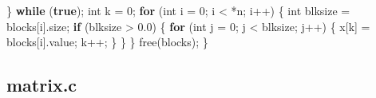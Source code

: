 \documentclass[
  12pt,
  letterpaper,
  DIV=11,
  numbers=noendperiod]{scrreprt}
\newenvironment{Shaded}{\begin{snugshade}}{\end{snugshade}}
\newcommand{\ControlFlowTok}[1]{\textcolor[rgb]{0.00,0.23,0.31}{\textbf{#1}}}
\newcommand{\DataTypeTok}[1]{\textcolor[rgb]{0.68,0.00,0.00}{#1}}
\newcommand{\DecValTok}[1]{\textcolor[rgb]{0.68,0.00,0.00}{#1}}
\newcommand{\FloatTok}[1]{\textcolor[rgb]{0.68,0.00,0.00}{#1}}
\newcommand{\KeywordTok}[1]{\textcolor[rgb]{0.00,0.23,0.31}{\textbf{#1}}}
\newcommand{\NormalTok}[1]{\textcolor[rgb]{0.00,0.23,0.31}{#1}}
\newcommand{\OperatorTok}[1]{\textcolor[rgb]{0.37,0.37,0.37}{#1}}
\theoremstyle{remark}
\begin{document}
\begin{Shaded}
\begin{Highlighting}[]
    \OperatorTok{\}} \ControlFlowTok{while} \OperatorTok{(}\KeywordTok{true}\OperatorTok{);}
    \DataTypeTok{int}\NormalTok{ k }\OperatorTok{=} \DecValTok{0}\OperatorTok{;}
    \ControlFlowTok{for} \OperatorTok{(}\DataTypeTok{int}\NormalTok{ i }\OperatorTok{=} \DecValTok{0}\OperatorTok{;}\NormalTok{ i }\OperatorTok{\textless{}} \OperatorTok{*}\NormalTok{n}\OperatorTok{;}\NormalTok{ i}\OperatorTok{++)} \OperatorTok{\{}
        \DataTypeTok{int}\NormalTok{ blksize }\OperatorTok{=}\NormalTok{ blocks}\OperatorTok{[}\NormalTok{i}\OperatorTok{].}\NormalTok{size}\OperatorTok{;}
        \ControlFlowTok{if} \OperatorTok{(}\NormalTok{blksize }\OperatorTok{\textgreater{}} \FloatTok{0.0}\OperatorTok{)} \OperatorTok{\{}
            \ControlFlowTok{for} \OperatorTok{(}\DataTypeTok{int}\NormalTok{ j }\OperatorTok{=} \DecValTok{0}\OperatorTok{;}\NormalTok{ j }\OperatorTok{\textless{}}\NormalTok{ blksize}\OperatorTok{;}\NormalTok{ j}\OperatorTok{++)} \OperatorTok{\{}
\NormalTok{                x}\OperatorTok{[}\NormalTok{k}\OperatorTok{]} \OperatorTok{=}\NormalTok{ blocks}\OperatorTok{[}\NormalTok{i}\OperatorTok{].}\NormalTok{value}\OperatorTok{;}
\NormalTok{                k}\OperatorTok{++;}
            \OperatorTok{\}}
        \OperatorTok{\}}
    \OperatorTok{\}}
\NormalTok{    free}\OperatorTok{(}\NormalTok{blocks}\OperatorTok{);}
\OperatorTok{\}}
\end{Highlighting}
\end{Shaded}

\subsection*{matrix.c}\label{matrix.c}
\end{document}
